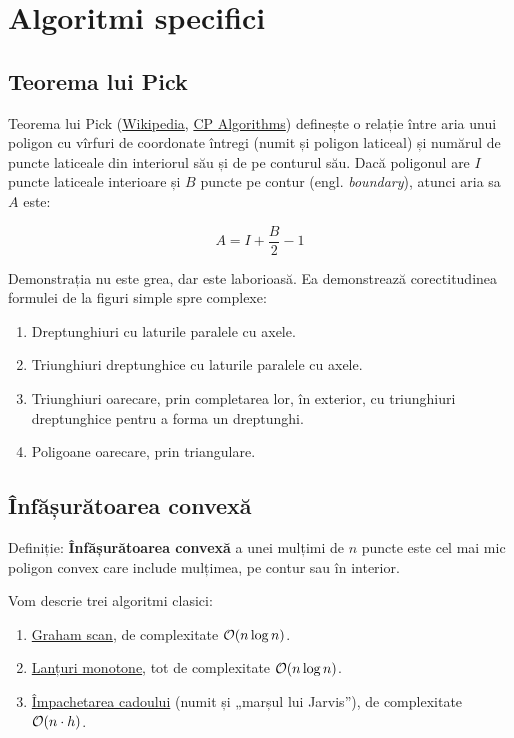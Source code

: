 \documentclass[../main.tex]{subfiles}
\begin{document}
\chapter{Algoritmi specifici}

\section{Teorema lui Pick}

Teorema lui Pick (\href{https://en.wikipedia.org/wiki/Pick's_theorem}{Wikipedia}, \href{https://cp-algorithms.com/geometry/picks-theorem.html}{CP Algorithms}) definește o relație între aria unui poligon cu vîrfuri de coordonate întregi (numit și poligon laticeal) și numărul de puncte laticeale din interiorul său și de pe conturul său. Dacă poligonul are $I$ puncte laticeale interioare și $B$ puncte pe contur (engl. \textit{boundary}), atunci aria sa $A$ este:

$$A = I + \frac{B}{2} - 1$$

Demonstrația nu este grea, dar este laborioasă. Ea demonstrează corectitudinea formulei de la figuri simple spre complexe:

\begin{enumerate}
  \item Dreptunghiuri cu laturile paralele cu axele.
  \item Triunghiuri dreptunghice cu laturile paralele cu axele.
  \item Triunghiuri oarecare, prin completarea lor, în exterior, cu triunghiuri dreptunghice pentru a forma un dreptunghi.
  \item Poligoane oarecare, prin triangulare.
\end{enumerate}

\section{Înfășurătoarea convexă}

Definiție: \textbf{Înfășurătoarea convexă} a unei mulțimi de $n$ puncte este cel mai mic poligon convex care include mulțimea, pe contur sau în interior.

Vom descrie trei algoritmi clasici:

\begin{enumerate}
  \item \href{https://en.wikipedia.org/wiki/Graham_scan}{Graham scan}, de complexitate $\mathcal{O}(n \log n)$.
  \item \href{https://en.wikibooks.org/wiki/Algorithm_Implementation/Geometry/Convex_hull/Monotone_chain}{Lanțuri monotone}, tot de complexitate $\mathcal{O}(n \log n)$.
  \item \href{https://en.wikipedia.org/wiki/Gift_wrapping_algorithm}{Împachetarea cadoului} (numit și „marșul lui Jarvis”), de complexitate $\mathcal{O}(n \cdot h)$.
\end{enumerate}
\end{document}
